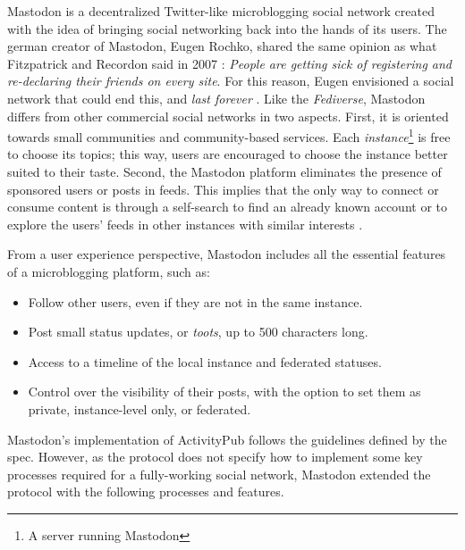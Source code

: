  Mastodon is a decentralized Twitter-like microblogging social network created with the idea of bringing social networking back into the hands of its users. The german creator of Mastodon, Eugen Rochko, shared the same opinion as what Fitzpatrick and Recordon said in 2007 \cite{fitzpatrick_recordon_2007}: \emph{People are getting sick of registering and re-declaring their friends on every site}. For this reason, Eugen envisioned a social network that could end this, and \emph{last forever} \cite{tilley_2018}. Like the \emph{Fediverse}, Mastodon differs from other commercial social networks in two aspects. First, it is oriented towards small communities and community-based services. Each \emph{instance}\footnote{A server running Mastodon} is free to choose its topics; this way, users are encouraged to choose the instance better suited to their taste. Second, the Mastodon platform eliminates the presence of sponsored users or posts in feeds. This implies that the only way to connect or consume content is through a self-search to find an already known account or to explore the users' feeds in other instances with similar interests \cite{8845221}. 
 
 From a user experience perspective, Mastodon includes all the essential features of a microblogging platform, such as:

\begin{itemize}
  \item Follow other users, even if they are not in the same instance. 
  \item Post small status updates, or \emph{toots}, up to 500 characters long. 
  \item Access to a timeline of the local instance and federated statuses. 
  \item Control over the visibility of their posts, with the option to set them as private, instance-level only, or federated. 
\end{itemize}

Mastodon's implementation of ActivityPub follows the guidelines defined by the spec. However, as the protocol does not specify how to implement some key processes required for a fully-working social network, Mastodon extended the protocol with the following processes and features.

